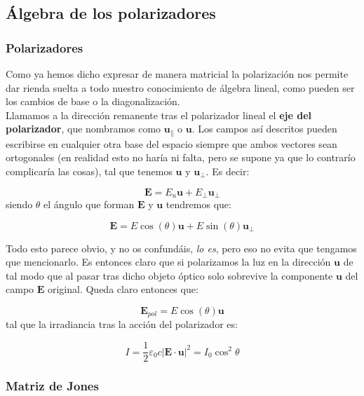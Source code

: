 \documentclass[12pt,a4paper]{article}
\newcommand{\En}{\mathbf{E}}
\newcommand{\un}{\mathbf{u}}
\numberwithin{equation}{section}
\numberwithin{figure}{section}
\begin{document}
\subsection{Álgebra de los polarizadores}

\subsubsection{Polarizadores}

Como ya hemos dicho expresar de manera matricial la polarización nos permite dar rienda suelta a todo nuestro conocimiento de álgebra lineal, como pueden ser los cambios de base o la diagonalización. \\

Llamamos a la dirección remanente tras el polarizador lineal el \textbf{eje del polarizador}, que nombramos como  $\un_\parallel$ o $\un$. Los campos así descritos pueden escribirse en cualquier otra base del espacio siempre que ambos vectores sean ortogonales (en realidad esto no haría ni falta, pero se supone ya que lo contrarío complicaría las cosas), tal que tenemos $\un$ y $\un_\perp$. Es decir:

\begin{equation}
\En = E_u \un  + E_\perp \un_\perp
\end{equation}
siendo $\theta$ el ángulo que forman $\En$ y $\un$ tendremos que:

\begin{equation}
\En = E \cos (\theta) \un + E \sin (\theta ) \un_\perp
\end{equation}

Todo esto parece obvio, y no os confundáis, \textit{lo es}, pero eso no evita que tengamos que mencionarlo. Es entonces claro que si polarizamos la luz en la dirección $\un$ de tal modo que al pasar tras dicho objeto óptico solo sobrevive la componente $\un$ del campo $\En$ original. Queda claro entonces que:

\begin{equation}
\En_{pol} = E \cos (\theta) \un
\end{equation}
tal que la irradiancia tras la acción del polarizador es:

\begin{equation}
I = \dfrac{1}{2} \varepsilon_0 c |\En \cdot \un |^2 = I_0 \cos^2 \theta
\end{equation}

\subsubsection{Matriz de Jones}
\end{document}
